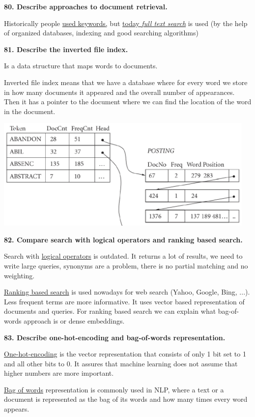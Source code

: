\textbf{80. Describe approaches to document retrieval.}

Historically people \underline{used keywords,} but \underline{today
\emph{full text search}} is used (by the help of organized databases,
indexing and good searching algorithms)

\textbf{81. Describe the inverted file index.}

Is a data structure that maps words to documents.

Inverted file index means that we have a database where for every word
we store in how many documents it appeared and the overall number of
appearances. Then it has a pointer to the document where we can find the
location of the word in the document.

\includegraphics[width=5.03646in,height=2.17521in]{media/image10.png}

\textbf{82. Compare search with logical operators and ranking based
search.}

Search with \underline{logical operators} is outdated. It returns a lot
of results, we need to write large queries, synonyms are a problem,
there is no partial matching and no weighting.

\underline{Ranking based search} is used nowadays for web search (Yahoo,
Google, Bing, ...). Less frequent terms are more informative. It uses
vector based representation of documents and queries. For ranking based
search we can explain what bag-of-words approach is or dense embeddings.

\textbf{83. Describe one-hot-encoding and bag-of-words representation.}

\underline{One-hot-encoding} is the vector representation that consists
of only 1 bit set to 1 and all other bits to 0. It assures that machine
learning does not assume that higher numbers are more important.

\underline{Bag of words} representation is commonly used in NLP, where a
text or a document is represented as the bag of its words and how many
times every word appears.

